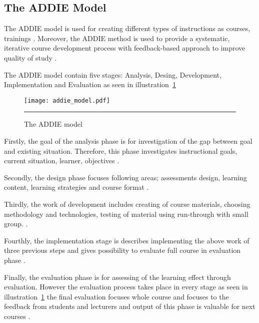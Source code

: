 \subsection{The ADDIE Model}

The \gls{ADDIE} model is used for creating different types of instructions as courses, trainings \citep{website:addie, lohr1998using}. Moreover, the ADDIE method is  used to provide a systematic, iterative course development process with feedback-based approach to improve quality of study \citep{website:using_addie}.

The ADDIE model contain five stages: Analysis, Desing, Development, Implementation and Evaluation as seen in illustration~\ref{figure:the addie model} \citep{website:addie}



\begin{figure}[H]
 \centering 
 \texttt{[image: addie\_model.pdf]}
 \rule{35em}{0.5pt} 
 \caption{The ADDIE model} 
 \label{figure:the addie model} 
\end{figure}

Firstly, the goal of the analysis phase is for investigation of the gap between goal and
existing situation. Therefore, this phase investigates instructional goals, current situation, learner, objectives \citep{chen2007learning, website:addie}.

Secondly, the design phase focuses following areas; assessments design, learning content, learning strategies and course format \citep{chen2007learning, website:addie}.


Thirdly, the work of development includes creating of course materials, choosing methodology and technologies, testing of material using run-through with small group. \citep{OppeArenduskeskus2010, website:addie, chen2007learning}.


Fourthly, the implementation stage is describes implementing the above work of three previous steps and gives possibility to evaluate full course in evaluation phase \citep{chen2007learning, website:addie}.


Finally, the evaluation phase is for assessing of the learning effect through evaluation. However the evaluation process takes place in every stage as seen in illustration~\ref{figure:the addie model} the final evaluation focuses whole course and focuses to the feedback from students and lecturers and output of this phase is valuable for next courses \citep{OppeArenduskeskus2010, website:addie}.


